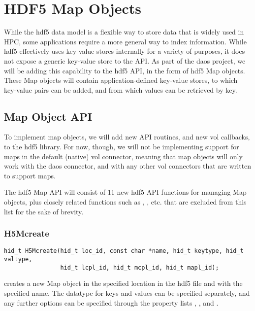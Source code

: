 \documentclass[../design_doc.tex]{subfiles}
\begin{document}
\section{HDF5 Map Objects}


While the \acrshort{hdf5} data model is a flexible way to store data that is widely used in HPC, some applications require a more general way to index information. While \acrshort{hdf5} effectively uses key-value stores internally for a variety of purposes, it does not expose a generic key-value store to the API. As part of the \acrshort{daos} project, we will be adding this capability to the \acrshort{hdf5} API, in the form of \acrshort{hdf5} Map objects. These Map objects will contain application-defined key-value stores, to which key-value pairs can be added, and from which values can be retrieved by key.

\subsection{Map Object API}
To implement map objects, we will add new API routines, and new \acrshort{vol} callbacks, to the \acrshort{hdf5} library. For now, though, we will not be implementing support for maps in the default (native) \acrshort{vol} \gls{connector}, meaning that map objects will only work with the \acrshort{daos} \gls{connector}, and with any other \acrshort{vol} connectors that are written to support maps.

The \acrshort{hdf5} Map API will consist of 11 new \acrshort{hdf5} API functions for managing Map objects, plus closely related functions such as , , etc. that are excluded from this list for the sake of brevity.

\subsubsection{H5Mcreate}

\begin{verbatim}
hid_t H5Mcreate(hid_t loc_id, const char *name, hid_t keytype, hid_t valtype,
                hid_t lcpl_id, hid_t mcpl_id, hid_t mapl_id);
\end{verbatim}

 creates a new Map object in the specified location in the \acrshort{hdf5} file and with the specified name. The datatype for keys and values can be specified separately, and any further options can be specified through the property lists , , and .
\end{document}
